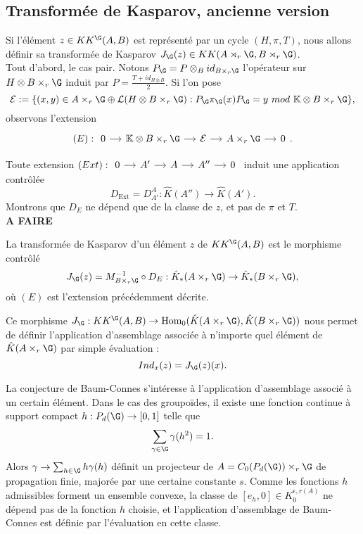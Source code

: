 
\subsection{Transformée de Kasparov, ancienne version}
Si l'élément $z\in KK^\G(A,B)$ est représenté par un cycle $(H,\pi,T)$, nous allons définir sa transformée de Kasparov $J_\G(z)\in KK(A\rtimes_r \G, B\rtimes_r\G)$. \\

Tout d'abord, le cas pair. Notons $P_\G=P\otimes_B id_{B\times_r \G}$ l'opérateur sur $H\otimes B\times_r \G$ induit par $P=\frac{T+id_{H\otimes B}}{2}$. Si l'on pose 
\[\mathcal E :=\{(x,y)\in A\times_r \G \oplus \mathcal L (H\otimes B\times_r \G) : P_\G \pi_\G(x) P_\G = y \ mod \ \K\otimes B\times_r \G\}, \]
observons l'extension
\[(E): \begin{tikzcd}[column sep = small]
0\arrow{r} & \K \otimes B\times_r \G \arrow{r} & \mathcal E \arrow{r} & A\times_r \G \arrow{r} & 0
\end{tikzcd}.\] 

Toute extension $(Ext):\begin{tikzcd}[column sep = small]0\arrow{r}& A' \arrow{r} & A \arrow{r} & A'' \arrow{r} & 0\end{tikzcd}$ induit une application contrôlée 
\[D_{\text{Ext}}=D_{A'}^A : \hat K(A'') \rightarrow \hat K(A'). \]
Montrons que $D_{E}$ ne dépend que de la classe de $z$, et pas de $\pi$ et $T$.\\
\textbf{A FAIRE}\\

\begin{definition}
La transformée de Kasparov d'un élément $z$ de $KK^\G(A,B)$ est le morphisme contrôlé 
\[J_\G (z) = M_{B\times_r \G}^{-1} \circ D_E : \hat K_*(A\times_r \G)\rightarrow \hat K_* (B\times_r \G),\]
où $(E)$ est l'extension précédemment décrite.
\end{definition}

Ce morphisme $J_\G : KK^\G(A,B)\rightarrow \text{Hom}_0(\hat K(A\times_r \G),\hat K(B\times_r \G))$ nous permet de définir l'application d'assemblage associée à n'importe quel élément de $\hat K(A\times_r \G)$ par simple évaluation :
\[Ind_x (z)= J_\G ( z ) (x).\]

La conjecture de Baum-Connes s'intéresse à l'application d'assemblage associé à un certain élément. Dans le cas des groupoïdes, il existe une fonction continue à support compact $h :P_d(\G) \rightarrow [0,1]$ telle que 
\[\sum_{\gamma\in \G} \gamma (h^2)=1.\]
Alors $ \gamma \rightarrow \sum_{h\in \G} h \gamma(h)$ définit un projecteur de $A=C_0(P_d(\G))\times_r \G$ de propagation finie, majorée par une certaine constante $s$. Comme les fonctions $h$ admissibles forment un ensemble convexe, la classe de $[e_h, 0]\in K_0^{\epsilon,r (A)}$ ne dépend pas de la fonction $h$ choisie, et l'application d'assemblage de Baum-Connes est définie par l'évaluation en cette classe.

